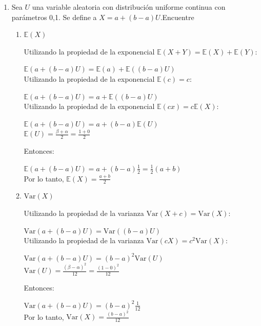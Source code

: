 \documentclass[11pt,a4paper]{report}
\begin{document}
\begin{enumerate}
{			Por lo tanto, la media del tiempo total hasta la
			falla de ambos componentes es 48.\\
		}

		\item{
			Sea $U$ una variable aleatoria con distribución uniforme continua
			con parámetros 0,1. Se define a $X = a+(b - a)U$.Encuentre
			\begin{enumerate}
				\item {
					$\mathbb{E}(X)$
					
					Utilizando la propiedad de la exponencial $\mathbb{E}(X + Y) = \mathbb{E}(X) + \mathbb{E}(Y)$:
					
					$\mathbb{E}(a+(b - a)U) = \mathbb{E}(a) + \mathbb{E}((b - a)U)$\\
					
					Utilizando la propiedad de la exponencial $\mathbb{E}(c) = c$:
					
					$\mathbb{E}(a+(b - a)U) = a + \mathbb{E}((b - a)U)$\\
					
					Utilizando la propiedad de la exponencial $\mathbb{E}(cx) = c\mathbb{E}(X)$:
					
					$\mathbb{E}(a+(b - a)U) = a + (b - a)\mathbb{E}(U)$\\
					
					$\mathbb{E}(U) = \frac{\beta + \alpha}{2} = \frac{1+0}{2}$
					
					Entonces:
					
					$\mathbb{E}(a+(b - a)U) = a + (b - a)\frac{1}{2} = \frac{1}{2}(a+b)$\\

					
					Por lo tanto, $\mathbb{E}(X) = \frac{a+b}{2}$\\
						
					
				}

				\item {
					$\text{Var}(X)$
					
					Utilizando la propiedad de la varianza $\text{Var}(X + c) = \text{Var}(X)$:
					
					$\text{Var}(a+(b - a)U) = \text{Var}((b - a)U)$\\
					
					Utilizando la propiedad de la varianza $\text{Var}(cX) = c^2\text{Var}(X)$:
					
					$\text{Var}(a+(b - a)U) = (b - a)^2 \text{Var}(U)$\\
					
									
					$\text{Var}(U) = \frac{(\beta - \alpha)^2}{12} = \frac{(1-0)^2}{12}$
					
					Entonces:
					
					$\text{Var}(a+(b - a)U) = (b - a)^2\frac{1}{12}$ \\

					
					Por lo tanto, $\text{Var}(X) = \frac{(b - a)^2}{12}$ \\
				}
			\end{enumerate}
			}
	\end{enumerate}
\end{document}
